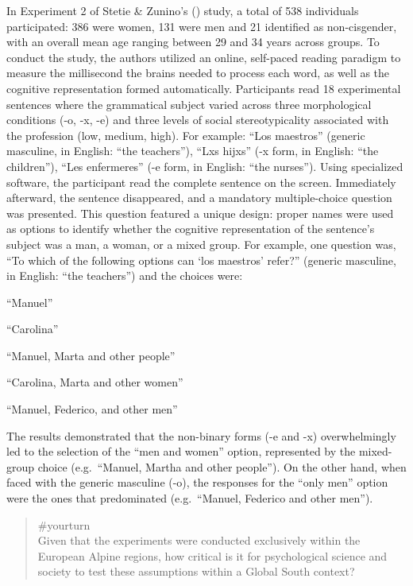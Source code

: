 \documentclass[
  letterpaper,
]{book}
\begin{document}
In Experiment 2 of Stetie \& Zunino's
() study, a
total of 538 individuals participated: 386 were women, 131 were men and
21 identified as non-cisgender, with an overall mean age ranging between
29 and 34 years across groups. To conduct the study, the authors
utilized an online, self-paced reading paradigm to measure the
millisecond the brains needed to process each word, as well as the
cognitive representation formed automatically. Participants read 18
experimental sentences where the grammatical subject varied across three
morphological conditions (-o, -x, -e) and three levels of social
stereotypicality associated with the profession (low, medium, high). For
example: ``Los maestros'' (generic masculine, in English: ``the
teachers''), ``Lxs hijxs'' (-x form, in English: ``the children''),
``Les enfermeres'' (-e form, in English: ``the nurses''). Using
specialized software, the participant read the complete sentence on the
screen. Immediately afterward, the sentence disappeared, and a mandatory
multiple-choice question was presented. This question featured a unique
design: proper names were used as options to identify whether the
cognitive representation of the sentence's subject was a man, a woman,
or a mixed group. For example, one question was, ``To which of the
following options can `los maestros' refer?'' (generic masculine, in
English: ``the teachers'') and the choices were:

``Manuel''

``Carolina''

``Manuel, Marta and other people''

``Carolina, Marta and other women''

``Manuel, Federico, and other men''

The results demonstrated that the non-binary forms (-e and -x)
overwhelmingly led to the selection of the ``men and women'' option,
represented by the mixed-group choice (e.g.~``Manuel, Martha and other
people''). On the other hand, when faced with the generic masculine
(-o), the responses for the ``only men'' option were the ones that
predominated (e.g.~``Manuel, Federico and other men'').

\begin{quote}
{\#yourturn}\\
Given that the experiments were conducted exclusively within the
European Alpine regions, how critical is it for psychological science
and society to test these assumptions within a Global South context?
\end{quote}
\end{document}
